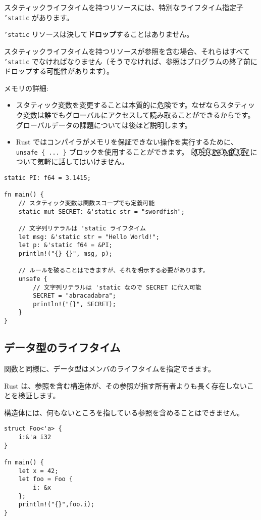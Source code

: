 スタティックライフタイムを持つリソースには、特別なライフタイム指定子
\texttt{'static} があります。

\texttt{'static}
リソースは決して\textbf{ドロップ}することはありません。

スタティックライフタイムを持つリソースが参照を含む場合、それらはすべて
\texttt{'static}
でなければなりません（そうでなければ、参照はプログラムの終了前にドロップする可能性があります）。

メモリの詳細:

\begin{itemize}
\item
  スタティック変数を変更することは本質的に危険です。なぜならスタティック変数は誰でもグローバルにアクセスして読み取ることができるからです。
  グローバルデータの課題については後ほど説明します。
\item
  Rust
  ではコンパイラがメモリを保証できない操作を実行するために、\texttt{unsafe\ \{\ ...\ \}}
  ブロックを使用することができます。 R̸͉̟͈͔̄͛̾̇͜U̶͓͖͋̅Ṡ̴͉͇̃̉̀T̵̻̻͔̟͉́͆Ơ̷̥̟̳̓͝N̶̨̼̹̲͛Ö̵̝͉̖̏̾̔M̶̡̠̺̠̐͜Î̷̛͓̣̃̐̏C̸̥̤̭̏͛̎͜O̶̧͚͖͔̊͗̇͠N̸͇̰̏̏̽̃
  について気軽に話してはいけません。
\end{itemize}

\begin{verbatim}
static PI: f64 = 3.1415;

fn main() {
    // スタティック変数は関数スコープでも定義可能
    static mut SECRET: &'static str = "swordfish";

    // 文字列リテラルは 'static ライフタイム
    let msg: &'static str = "Hello World!";
    let p: &'static f64 = &PI;
    println!("{} {}", msg, p);

    // ルールを破ることはできますが、それを明示する必要があります。
    unsafe {
        // 文字列リテラルは 'static なので SECRET に代入可能
        SECRET = "abracadabra";
        println!("{}", SECRET);
    }
}
\end{verbatim}

\subsection{データ型のライフタイム}

関数と同様に、データ型はメンバのライフタイムを指定できます。

Rust
は、参照を含む構造体が、その参照が指す所有者よりも長く存在しないことを検証します。

構造体には、何もないところを指している参照を含めることはできません。

\begin{verbatim}
struct Foo<'a> {
    i:&'a i32
}

fn main() {
    let x = 42;
    let foo = Foo {
        i: &x
    };
    println!("{}",foo.i);
}
\end{verbatim}

